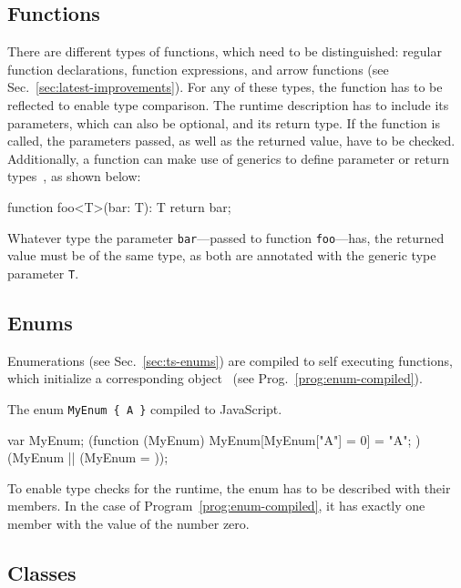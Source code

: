 
\subsection{Functions}

There are different types of functions, which need to be distinguished: regular function declarations, function expressions, and arrow functions (see Sec.~\ref{sec:latest-improvements}). For any of these types, the function has to be reflected to enable type comparison. The runtime description has to include its parameters, which can also be optional, and its return type. If the function is called, the parameters passed, as well as the returned value, have to be checked. Additionally, a function can make use of generics to define parameter or return types~\cite{TypeScriptHandbook:Generics}, as shown below:
\begin{JsCode}[numbers=none]
function foo<T>(bar: T): T {
  return bar;
} 
\end{JsCode}
Whatever type the parameter \texttt{bar}---passed to function \texttt{foo}---has, the returned value must be of the same type, as both are annotated with the generic type parameter \texttt{T}.

\subsection{Enums}

Enumerations (see Sec.~\ref{sec:ts-enums}) are compiled to self executing functions, which initialize a corresponding object~\cite{TypeScriptHandbook:Enums} (see Prog.~\ref{prog:enum-compiled}).
\begin{program}
\caption{The enum \texttt{MyEnum \{ A \}} compiled to JavaScript.~\cite{TypeScriptHandbook:Enums}}
\label{prog:enum-compiled}
\begin{JsCode}
var MyEnum;
(function (MyEnum) {
    MyEnum[MyEnum["A"] = 0] = "A";
})(MyEnum || (MyEnum = {}));
\end{JsCode}
\end{program}
To enable type checks for the runtime, the enum has to be described with their members. In the case of Program~\ref{prog:enum-compiled}, it has exactly one member with the value of the number zero.

\subsection{Classes}

